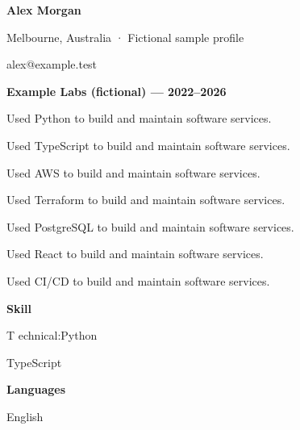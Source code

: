 \documentclass[10pt,a4paper]{article}
\begin{document}
{\LARGE\bfseries\color{navy} Alex Morgan}\par
Melbourne, Australia · Fictional sample profile\par
alex@example.test\par
{\large\bfseries\color{navy} Example Labs (fictional) — 2022–2026}\par
Used Python to build and maintain software services.\par
Used TypeScript to build and maintain software services.\par
Used AWS to build and maintain software services.\par
Used Terraform to build and maintain software services.\par
Used PostgreSQL to build and maintain software services.\par
Used React to build and maintain software services.\par
Used CI/CD to build and maintain software services.\par
{\large\bfseries\color{navy} Skill}\par
T echnical:Python\par
TypeScript\par
{\large\bfseries\color{navy} Languages}\par
English\par
\end{document}
